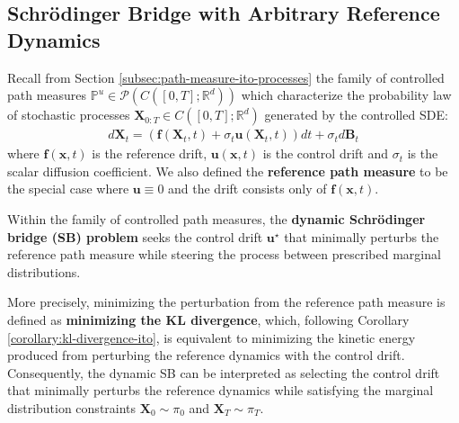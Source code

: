 \documentclass{article}
\newcommand{\boldtext}[1]{\textbf{\textcolor{MyGreen}{#1}}}
\begin{document}
\subsection{Schrödinger Bridge with Arbitrary Reference Dynamics}
\label{subsec:nonlinear-sbp}
Recall from Section \ref{subsec:path-measure-ito-processes} the family of controlled path measures $\mathbb{P}^u\in \mathcal{P}(C([0,T];\mathbb{R}^d))$ which characterize the probability law of stochastic processes $\boldsymbol{X}_{0:T}\in C([0,T];\mathbb{R}^d)$ generated by the controlled SDE:
\begin{align}
    d\boldsymbol{X}_t=(\boldsymbol{f}(\boldsymbol{X}_t,t)+\sigma_t\boldsymbol{u}(\boldsymbol{X}_t,t))dt+ \sigma_td\boldsymbol{B}_t\tag{Controlled SDE}
\end{align}
where $\boldsymbol{f}(\boldsymbol{x},t)$ is the reference drift, $\boldsymbol{u}(\boldsymbol{x},t)$ is the control drift and $\sigma_t$ is the scalar diffusion coefficient. We also defined the \textbf{reference path measure} to be the special case where $\boldsymbol{u}\equiv 0$ and the drift consists only of $\boldsymbol{f}(\boldsymbol{x},t)$.

Within the family of controlled path measures, the \boldtext{dynamic Schrödinger bridge (SB) problem} seeks the control drift $\boldsymbol{u}^\star$ that minimally perturbs the reference path measure while steering the process between prescribed marginal distributions.

More precisely, minimizing the perturbation from the reference path measure is defined as \textbf{minimizing the KL divergence}, which, following Corollary \ref{corollary:kl-divergence-ito}, is equivalent to minimizing the kinetic energy produced from perturbing the reference dynamics with the control drift. Consequently, the dynamic SB can be interpreted as selecting the control drift that minimally perturbs the reference dynamics while satisfying the marginal distribution constraints $\boldsymbol{X}_0\sim \pi_0$ and $\boldsymbol{X}_T\sim \pi_T$.
\end{document}
